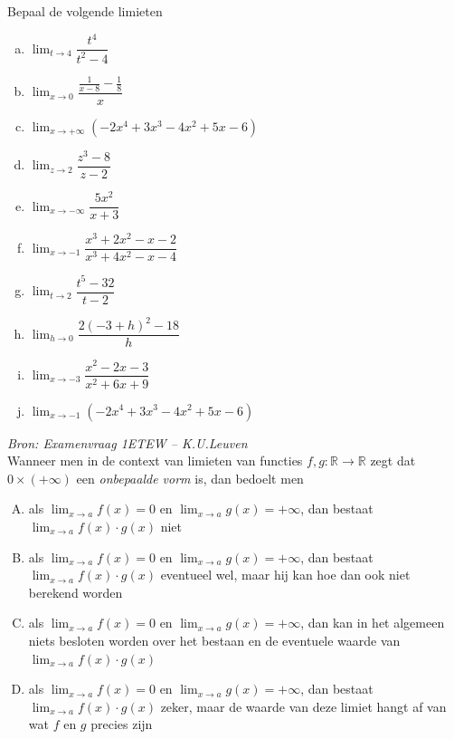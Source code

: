 \documentclass[12pt]{article}
\begin{document}
\begin{oefening}
  Bepaal de volgende limieten
  \begin{multicols}{2}
  \begin{enumerate}[(a)]
  \itemsep1em
  \item $\displaystyle\lim_{t\to 4}\dfrac{t^4}{t^2-4}$
  \item $\displaystyle\lim_{x\to 0}\dfrac{\frac{1}{x-8}-\frac{1}{8}}{x}$
  \item $\displaystyle\lim_{x\to +\infty}\left(-2x^4+3x^3-4x^2+5x-6\right)$
  \item $\displaystyle\lim_{z\to 2}\dfrac{z^3-8}{z-2}$
  \item $\displaystyle\lim_{x\to -\infty}\dfrac{5x^2}{x+3}$
  \item $\displaystyle\lim_{x\to -1}\dfrac{x^3+2x^2-x-2}{x^3+4x^2-x-4}$
  \item $\displaystyle\lim_{t\to 2}\dfrac{t^5-32}{t-2}$
  \item $\displaystyle\lim_{h\to 0}\dfrac{2(-3+h)^2-18}{h}$
  \item $\displaystyle\lim_{x\to -3}\dfrac{x^2-2x-3}{x^2+6x+9}$
  \item $\displaystyle\lim_{x\to -1}\left(-2x^4+3x^3-4x^2+5x-6\right)$
  \end{enumerate}
  \end{multicols}
\end{oefening}

\begin{oefening}{\em\small Bron: Examenvraag 1ETEW -- K.U.Leuven}\\
Wanneer men in de context van limieten van functies $f,g:\mathbb{R}\to\mathbb{R}$ zegt dat $0\times(+\infty)$ een
{\em onbepaalde vorm} is, dan bedoelt men
  \begin{enumerate}[(A)]
  \itemsep1em
  \item als $\lim_{x\to a}f(x)=0$ en $\lim_{x\to a}g(x)=+\infty$, dan bestaat $\lim_{x\to a}f(x)\cdot g(x)$ niet
  \item als $\lim_{x\to a}f(x)=0$ en $\lim_{x\to a}g(x)=+\infty$, dan bestaat $\lim_{x\to a}f(x)\cdot g(x)$ eventueel wel, maar hij kan hoe dan ook niet berekend worden
  \item als $\lim_{x\to a}f(x)=0$ en $\lim_{x\to a}g(x)=+\infty$, dan kan in het algemeen niets besloten worden over het bestaan en de eventuele waarde van $\lim_{x\to a}f(x)\cdot g(x)$
  \item als $\lim_{x\to a}f(x)=0$ en $\lim_{x\to a}g(x)=+\infty$, dan bestaat $\lim_{x\to a}f(x)\cdot g(x)$ zeker, maar de waarde van deze limiet hangt af van wat $f$ en $g$ precies zijn
  \end{enumerate}
\end{oefening}
\end{document}
